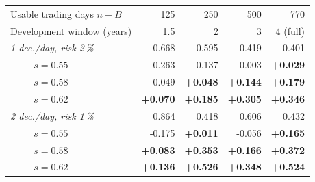 \begin{tabular}{llrrrr}
\toprule
\multicolumn{2}{l}{Usable trading days $n - B$} & 125 & 250 & 500 & 770 \\
\multicolumn{2}{l}{Development window (years)} & 1.5 & 2 & 3 & 4 (full) \\
\midrule
\multicolumn{2}{l}{\emph{1 dec./day, risk 2\,\%}} & 0.668 & 0.595 & 0.419 & 0.401 \\
& $s=0.55$ & -0.263 & -0.137 & -0.003 & \textbf{+0.029} \\
& $s=0.58$ & -0.049 & \textbf{+0.048} & \textbf{+0.144} & \textbf{+0.179} \\
& $s=0.62$ & \textbf{+0.070} & \textbf{+0.185} & \textbf{+0.305} & \textbf{+0.346} \\
\multicolumn{2}{l}{\emph{2 dec./day, risk 1\,\%}} & 0.864 & 0.418 & 0.606 & 0.432 \\
& $s=0.55$ & -0.175 & \textbf{+0.011} & -0.056 & \textbf{+0.165} \\
& $s=0.58$ & \textbf{+0.083} & \textbf{+0.353} & \textbf{+0.166} & \textbf{+0.372} \\
& $s=0.62$ & \textbf{+0.136} & \textbf{+0.526} & \textbf{+0.348} & \textbf{+0.524} \\
\bottomrule
\end{tabular}
